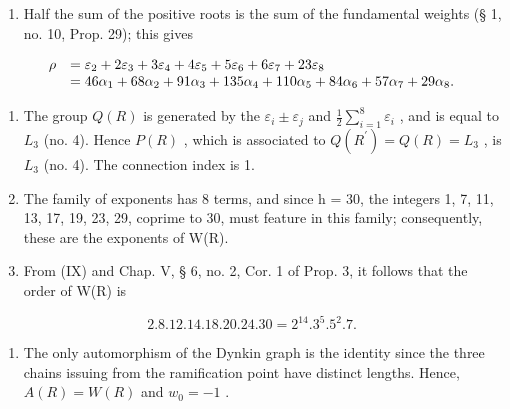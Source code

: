 \begin{enumerate}
\def\labelenumi{(\Roman{enumi})}
\setcounter{enumi}{6}
\tightlist
\item
  Half the sum of the positive roots is the sum of the fundamental weights (§ 1, no. 10, Prop. 29); this gives
\end{enumerate}

\[
\begin{array}{r l} \rho & = \varepsilon_ {2} + 2 \varepsilon_ {3} + 3 \varepsilon_ {4} + 4 \varepsilon_ {5} + 5 \varepsilon_ {6} + 6 \varepsilon_ {7} + 23 \varepsilon_ {8} \\ & = 46 \alpha_ {1} + 68 \alpha_ {2} + 91 \alpha_ {3} + 135 \alpha_ {4} + 110 \alpha_ {5} + 84 \alpha_ {6} + 57 \alpha_ {7} + 29 \alpha_ {8}. \end{array}
\]

\begin{enumerate}
\def\labelenumi{(\Roman{enumi})}
\setcounter{enumi}{7}
\item
  The group \(Q(R)\) is generated by the \(\varepsilon_{i} \pm \varepsilon_{j}\) and \(\frac{1}{2} \sum_{i=1}^{8} \varepsilon_{i}\) , and is equal to \(L_{3}\) (no. 4). Hence \(P(R)\) , which is associated to \(Q(R^{\prime}) = Q(R) = L_{3}\) , is \(L_{3}\) (no. 4). The connection index is 1.
\item
  The family of exponents has 8 terms, and since h = 30, the integers 1, 7, 11, 13, 17, 19, 23, 29, coprime to 30, must feature in this family; consequently, these are the exponents of W(R).
\item
  From (IX) and Chap. V, § 6, no. 2, Cor. 1 of Prop. 3, it follows that the order of W(R) is
\end{enumerate}

\[
2. 8. 12. 14. 18. 20. 24. 30 = 2 ^ {14}. 3 ^ {5}. 5 ^ {2}. 7.
\]

\begin{enumerate}
\def\labelenumi{(\Roman{enumi})}
\setcounter{enumi}{10}
\tightlist
\item
  The only automorphism of the Dynkin graph is the identity since the three chains issuing from the ramification point have distinct lengths. Hence, \(A(R) = W(R)\) and \(w_{0} = -1\) .
\end{enumerate}

